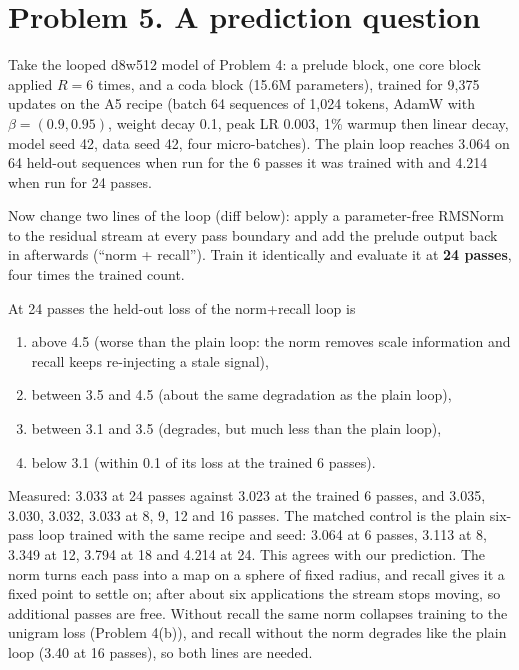 \section*{Problem 5. A prediction question}

 Take the looped d8w512 model of Problem 4: a prelude block, one core block applied $R=6$ times, and a coda block (15.6M parameters), trained for 9,375 updates on the A5 recipe (batch 64 sequences of 1,024 tokens, AdamW with $\beta=(0.9,0.95)$, weight decay 0.1, peak LR 0.003, 1\% warmup then linear decay, model seed 42, data seed 42, four micro-batches). The plain loop reaches 3.064 on 64 held-out sequences when run for the 6 passes it was trained with and 4.214 when run for 24 passes.

Now change two lines of the loop (diff below): apply a parameter-free RMSNorm to the residual stream at every pass boundary and add the prelude output back in afterwards (``norm + recall''). Train it identically and evaluate it at \textbf{24 passes}, four times the trained count.

 At 24 passes the held-out loss of the norm+recall loop is
\begin{enumerate}[label=(\Alph*)]
\item above 4.5 (worse than the plain loop: the norm removes scale information and recall keeps re-injecting a stale signal),
\item between 3.5 and 4.5 (about the same degradation as the plain loop),
\item between 3.1 and 3.5 (degrades, but much less than the plain loop),
\item below 3.1 (within 0.1 of its loss at the trained 6 passes).
\end{enumerate}

 Measured: 3.033 at 24 passes against 3.023 at the trained 6 passes, and 3.035, 3.030, 3.032, 3.033 at 8, 9, 12 and 16 passes. The matched control is the plain six-pass loop trained with the same recipe and seed: 3.064 at 6 passes, 3.113 at 8, 3.349 at 12, 3.794 at 18 and 4.214 at 24. This agrees with our prediction. The norm turns each pass into a map on a sphere of fixed radius, and recall gives it a fixed point to settle on; after about six applications the stream stops moving, so additional passes are free. Without recall the same norm collapses training to the unigram loss (Problem 4(b)), and recall without the norm degrades like the plain loop (3.40 at 16 passes), so both lines are needed.

